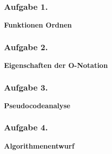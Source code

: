 \documentclass[a4paper,12pt]{article}
\newcommand{\ex}[1]{\newpage\subsubsection*{Aufgabe #1.}}
\begin{document}
	\ex{1}

	\textbf{Funktionen Ordnen}
	\begin{center}
		
	\end{center}

	\ex{2}

	\textbf{Eigenschaften der O-Notation}
	\begin{center}
		
	\end{center}

	\ex{3}

	\textbf{Pseudocodeanalyse}
	\begin{center}
		
	\end{center}

	\ex{4}

	\textbf{Algorithmenentwurf}
	\begin{center}
		
	\end{center}
\end{document}

